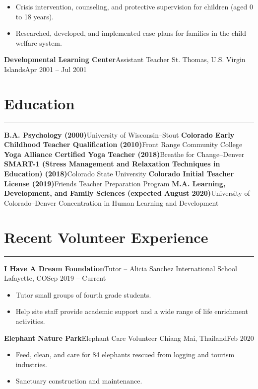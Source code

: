 \documentclass[letterpaper,10pt]{article}
\newcommand{\mblue}{\color{darkblue}}
\begin{document}
\begin{itemize}
    \item Crisis intervention, counseling, and protective supervision for children (aged 0 to 18 years).
    \item Researched, developed, and implemented case plans for families in the child welfare system.
\end{itemize}

\vspace{1pc}
\textbf{Developmental Learning Center}\hfill Assistant Teacher
\smallbreak St. Thomas, U.S. Virgin Islands\hfill Apr 2001 -- Jul 2001


\section*{\mblue Education}

\vspace{-2.15pc}
{\hfill\mblue\rule{5.845in}{0.02cm}}

\vspace{1pc}
\textbf{B.A. Psychology (2000)}\hfill University of Wisconsin--Stout
\bigbreak\textbf{Colorado Early Childhood Teacher Qualification (2010)}\hfill Front Range Community College
\bigbreak\textbf{Yoga Alliance Certified Yoga Teacher (2018)}\hfill Breathe for Change--Denver
\bigbreak\textbf{SMART-1 (Stress Management and Relaxation Techniques in Education) (2018)}\hfill Colorado State University
\bigbreak\textbf{Colorado Initial Teacher License (2019)}\hfill Friends Teacher Preparation Program
\bigbreak\textbf{M.A. Learning, Development, and Family Sciences (expected August 2020)}\hfill University of Colorado--Denver
\smallbreak Concentration in Human Learning and Development

\section*{\mblue Recent Volunteer Experience}

\vspace{-2.15pc}
{\hfill\mblue\rule{4.17in}{0.02cm}}

\vspace{1pc}
\textbf{I Have A Dream Foundation}\hfill Tutor -- Alicia Sanchez International School
\smallbreak Lafayette, CO\hfill Sep 2019 -- Current

\begin{itemize}
    \item Tutor small groups of fourth grade students.
    \item Help site staff provide academic support and a wide range of life enrichment activities.
\end{itemize}

\vspace{1pc}
\textbf{Elephant Nature Park}\hfill Elephant Care Volunteer
\smallbreak Chiang Mai, Thailand\hfill Feb 2020

\begin{itemize}
    \item Feed, clean, and care for 84 elephants rescued from logging and tourism industries.
    \item Sanctuary construction and maintenance.
\end{itemize}
\end{document}
